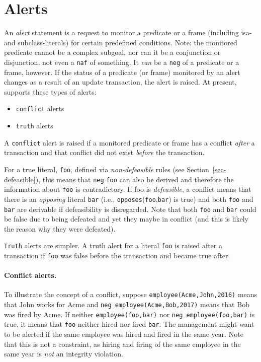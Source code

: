 
\section{Alerts} \label{sec-alerts}

An \emph{alert} statement is a request to monitor a predicate or a frame
(including isa- and subclass-literals) for certain predefined conditions.
Note: the monitored predicate cannot be a complex subgoal, nor can it be a
conjunction or disjunction, not even a \texttt{\bs{}naf} of something.
It \emph{can} be a \texttt{\bs{}neg} of a predicate or a frame, however. 
If the status of a predicate (or frame) monitored by an alert changes
as a result of an update transaction, the alert is raised.
At present, \ERGO supports these types of alerts:
\begin{itemize}
\item  \texttt{conflict} alerts
\item  \texttt{truth}  alerts
\end{itemize}
A \texttt{conflict} alert is raised if a monitored predicate or frame
has a conflict \emph{after} a transaction and that conflict did not exist
\emph{before} the transaction.

For a true literal, \texttt{foo},  defined via \emph{non-defeasible} rules (see
Section~\ref{sec-defeasible}), this means
that \texttt{\bs{}neg} \texttt{foo} can also be derived and therefore the
information about \texttt{foo} is contradictory.
If foo is \emph{defeasible}, a conflict
means that there is an \textit{opposing}
literal \texttt{bar} (i.e., \texttt{\bs{}opposes}(\texttt{foo},\texttt{bar}) is
true) and both \texttt{foo} and \texttt{bar} are derivable if defeasibility is
disregarded.  Note that both \texttt{foo} and \texttt{bar} could be false due
to being defeated and yet they maybe in conflict (and this is likely the
reason why they were defeated).

\texttt{Truth} alerts are simpler. A truth alert for a literal \texttt{foo}
is raised after a transaction
if \texttt{foo} was false before  the transaction and became true after.

\paragraph{Conflict alerts.}
To illustrate the concept of a conflict, suppose
\texttt{employee(Acme,John,2016)} means that John works for Acme and
\texttt{\bs{}neg employee(Acme,Bob,2017)} means that Bob was fired by Acme.
If neither \texttt{employee(foo,bar)} nor \texttt{\bs{}neg
  employee(foo,bar)} is true, it means that \texttt{foo} neither hired nor
fired \texttt{bar}.   The management might want to be alerted if the same
employee was hired and fired in the same year. Note that
this is not a constraint, as hiring and firing of the same employee in the
same year is \emph{not} an integrity violation.


